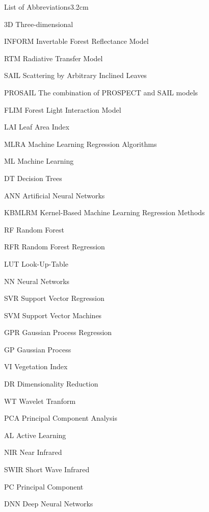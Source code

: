 \begin{mclistof}{List of Abbreviations}{3.2cm}

\item[3D] Three-dimensional
\item[INFORM] Invertable Forest Reflectance Model
\item[RTM] Radiative Transfer Model
\item[SAIL] Scattering by Arbitrary Inclined Leaves
\item[PROSAIL] The combination of PROSPECT and SAIL models
\item[FLIM] Forest Light Interaction Model
\item[LAI] Leaf Area Index
\item[MLRA] Machine Learning Regression Algorithms
\item[ML] Machine Learning
\item[DT] Decision Trees
\item[ANN] Artificial Neural Networks
\item[KBMLRM] Kernel-Based Machine Learning Regression Methods
\item[RF] Random Forest
\item[RFR] Random Forest Regression
\item[LUT] Look-Up-Table
\item[NN] Neural Networks
\item[SVR] Support Vector Regression
\item[SVM] Support Vector Machines
\item[GPR] Gaussian Process Regression
\item[GP] Gaussian Process
\item[VI] Vegetation Index
\item[DR] Dimensionality Reduction
\item[WT] Wavelet Tranform
\item[PCA] Principal Component Analysis
\item[AL] Active Learning
\item[NIR] Near Infrared
\item[SWIR] Short Wave Infrared
\item[PC] Principal Component
\item[DNN] Deep Neural Networks

\end{mclistof} 
